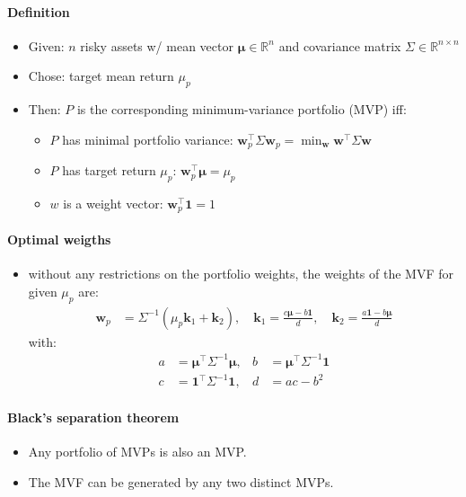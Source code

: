 \documentclass[a4paper,landscape,8pt,fleqn]{scrartcl}
\begin{document}
\begin{multicols*}{3}
\paragraph{Definition}
\begin{itemize}
\item Given: $n$ risky assets w/ mean vector $\bm \mu \in \mathbb{R}^n$ and covariance matrix $\Sigma \in \mathbb{R}^{n \times n}$
\item Chose: target mean return $\mu_p$
\item Then: $P$ is the corresponding minimum-variance portfolio (MVP) iff:
\begin{itemize}
\item $P$ has minimal portfolio variance: $\bm w_p^\top \Sigma \bm w_p = \min_{\bm w} \bm w^\top \Sigma \bm w$
\item $P$ has target return $\mu_p$: $\bm w_p^\top \bm \mu = \mu_p$
\item $w$ is a weight vector: $\bm w_p^\top \bm  1 = 1$
\end{itemize}
\end{itemize}

\paragraph{Optimal weigths}
\begin{itemize}
\item without any restrictions on the portfolio weights, the weights of the MVF for given $\mu_p$ are:
\begin{align*}
\bm w_p &= \Sigma^{-1} (\mu_p \bm k_1 + \bm k_2), \quad \bm k_1 = \frac{c \bm \mu - b \bm 1}{d}, \quad \bm k_2 = \frac{a \bm 1 - b \bm \mu}{d}
\end{align*}
with:
\begin{align*}
a &= \bm \mu^\top \Sigma^{-1} \bm \mu, & b &= \bm \mu^\top \Sigma^{-1} \bm 1 \\
c &= \bm 1^\top \Sigma^{-1} \bm 1, & d &= ac - b^2
\end{align*}
\end{itemize}

\paragraph{Black's separation theorem}
\begin{itemize}
\item Any portfolio of MVPs is also an MVP.
\item The MVF can be generated by any two distinct MVPs.
\end{itemize}


\end{multicols*}
\end{document}
